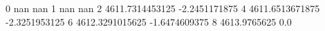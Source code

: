 0 nan nan
1 nan nan
2 4611.7314453125 -2.2451171875
4 4611.6513671875 -2.3251953125
6 4612.3291015625 -1.6474609375
8 4613.9765625 0.0
